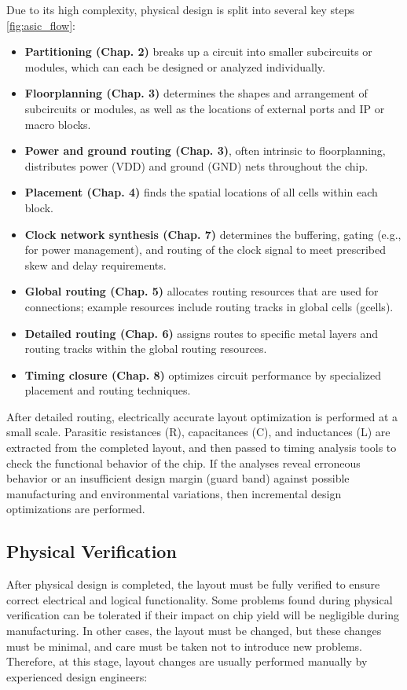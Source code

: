 Due to its high complexity, physical design is split into several key steps \ref{fig:asic_flow}:

\begin{itemize}
    \item \textbf{Partitioning (Chap. 2)} breaks up a circuit into smaller subcircuits or modules, which can each be designed or analyzed individually.
    \item \textbf{Floorplanning (Chap. 3)} determines the shapes and arrangement of subcircuits or modules, as well as the locations of external ports and IP or macro blocks.
    \item \textbf{Power and ground routing (Chap. 3)}, often intrinsic to floorplanning, distributes power (VDD) and ground (GND) nets throughout the chip.
    \item \textbf{Placement (Chap. 4)} finds the spatial locations of all cells within each block.
    \item \textbf{Clock network synthesis (Chap. 7)} determines the buffering, gating (e.g., for power management), and routing of the clock signal to meet prescribed skew and delay requirements.
    \item \textbf{Global routing (Chap. 5)} allocates routing resources that are used for connections; example resources include routing tracks in global cells (gcells).
    \item \textbf{Detailed routing (Chap. 6)} assigns routes to specific metal layers and routing tracks within the global routing resources.
    \item \textbf{Timing closure (Chap. 8)} optimizes circuit performance by specialized placement and routing techniques.
\end{itemize}

After detailed routing, electrically accurate layout optimization is performed at a small scale. Parasitic resistances (R), capacitances (C), and inductances (L) are extracted from the completed layout, and then passed to timing analysis tools to check the functional behavior of the chip. If the analyses reveal erroneous behavior or an insufficient design margin (guard band) against possible manufacturing and environmental variations, then incremental design optimizations are performed.


\subsection{Physical Verification}

After physical design is completed, the layout must be fully verified to ensure correct electrical and logical functionality. Some problems found during physical verification can be tolerated if their impact on chip yield will be negligible during manufacturing. In other cases, the layout must be changed, but these changes must be minimal, and care must be taken not to introduce new problems. Therefore, at this stage, layout changes are usually performed manually by experienced design engineers:

